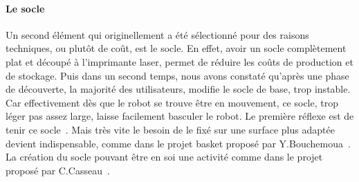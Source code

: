         \paragraph{Le socle}
            Un second élément qui originellement a été sélectionné pour des raisons techniques, ou plutôt de coût, est le socle. En effet, avoir un socle complètement plat et découpé à l'imprimante laser, permet de réduire les coûts de production et de stockage.
            Puis dans un second temps, nous avons constaté qu'après une phase de découverte, la majorité des utilisateurs, modifie le socle de base, trop instable. Car effectivement dès que le robot se trouve être en mouvement, ce socle, trop léger \etou pas assez large, laisse facilement basculer le robot. Le première réflexe est de tenir ce socle~. Mais très vite le besoin de le fixé sur une surface plus adaptée devient indispensable, comme dans le projet basket proposé par Y.Bouchemoua~. La création du socle pouvant être en soi une activité comme dans le projet proposé par C.Casseau~. 

